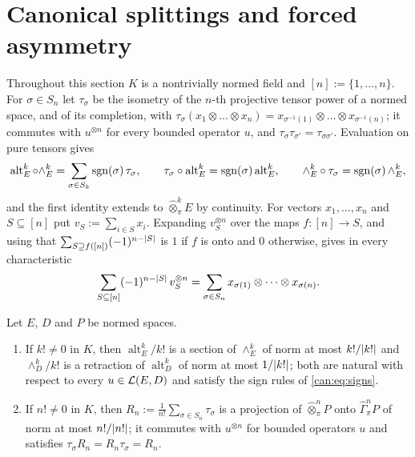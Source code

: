 \section{Canonical splittings and forced asymmetry}\label{sec:canonical}

Throughout this section $K$ is a nontrivially normed field and $[n]:=\{1,\dots,n\}$. For $\sigma\in S_n$ let
$\tau_\sigma$ be the isometry of the $n$\nobreakdash-th projective tensor power of a normed space, and of its completion,
with $\tau_\sigma(x_1\otimes\dots\otimes x_n)=x_{\sigma^{-1}(1)}\otimes\dots\otimes x_{\sigma^{-1}(n)}$; it commutes with
$u^{\otimes n}$ for every bounded operator $u$, and $\tau_\sigma\tau_{\sigma'}=\tau_{\sigma\sigma'}$. Evaluation on pure
tensors gives
\begin{equation}\label{can:eq:signs}
 \operatorname{alt}^k_E\circ\wedge^k_E=\sum_{\sigma\in S_k}\operatorname{sgn}(\sigma)\,\tau_\sigma,\qquad
 \tau_\sigma\circ\operatorname{alt}^k_E=\operatorname{sgn}(\sigma)\operatorname{alt}^k_E,\qquad
 \wedge^k_E\circ\tau_\sigma=\operatorname{sgn}(\sigma)\,\wedge^k_E ,
\end{equation}
and the first identity extends to $\widehat\otimes^k_\pi E$ by continuity. For vectors $x_1,\dots,x_n$ and
$S\subseteq[n]$ put $v_S:=\sum_{i\in S}x_i$. Expanding $v_S^{\otimes n}$ over the maps $f\colon[n]\to S$, and using that
$\sum_{S\supseteq f([n])}(-1)^{n-\lvert S\rvert}$ is $1$ if $f$ is onto and $0$ otherwise, gives in every characteristic
\begin{equation}\label{can:eq:polarization}
 \sum_{S\subseteq[n]}(-1)^{n-\lvert S\rvert}\,v_S^{\otimes n}=\sum_{\sigma\in S_n}x_{\sigma(1)}\otimes\dots\otimes x_{\sigma(n)} .
\end{equation}

\begin{proposition}\label{can:prop:natural}
Let $E$, $D$ and $P$ be normed spaces.
\begin{enumerate}
\item If $k!\ne0$ in $K$, then $\operatorname{alt}^k_E/k!$ is a section of $\wedge^k_E$ of norm at most $k!/\lvert k!\rvert$ and
$\wedge^k_D/k!$ is a retraction of $\operatorname{alt}^k_D$ of norm at most $1/\lvert k!\rvert$; both are natural with respect
to every $u\in\mathcal L(E,D)$ and satisfy the sign rules of \eqref{can:eq:signs}.
\item If $n!\ne0$ in $K$, then $R_n:=\frac1{n!}\sum_{\sigma\in S_n}\tau_\sigma$ is a projection of
$\widehat\otimes^n_\pi P$ onto $\widehat\Gamma^n_\pi P$ of norm at most $n!/\lvert n!\rvert$; it commutes with $u^{\otimes n}$ for
bounded operators $u$ and satisfies $\tau_\sigma R_n=R_n\tau_\sigma=R_n$.
\end{enumerate}
\end{proposition}


